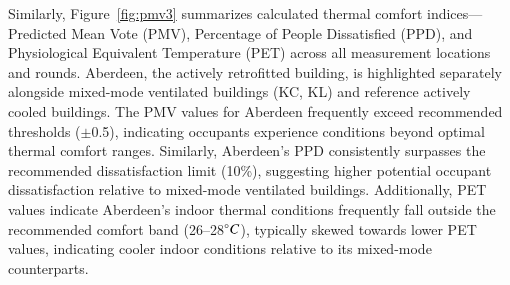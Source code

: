 \documentclass[preprint,12pt]{elsarticle}
\begin{document}
Similarly, Figure~\ref{fig:pmv3} summarizes calculated thermal comfort indices—Predicted Mean Vote (PMV), Percentage of People Dissatisfied (PPD), and Physiological Equivalent Temperature (PET) across all measurement locations and rounds. Aberdeen, the actively retrofitted building, is highlighted separately alongside mixed-mode ventilated buildings (KC, KL) and reference actively cooled buildings. The PMV values for Aberdeen frequently exceed recommended thresholds ($\pm$0.5), indicating occupants experience conditions beyond optimal thermal comfort ranges. Similarly, Aberdeen’s PPD consistently surpasses the recommended dissatisfaction limit (10\%), suggesting higher potential occupant dissatisfaction relative to mixed-mode ventilated buildings. Additionally, PET values indicate Aberdeen’s indoor thermal conditions frequently fall outside the recommended comfort band (26–28$\degree C$), typically skewed towards lower PET values, indicating cooler indoor conditions relative to its mixed-mode counterparts.


\end{document}
